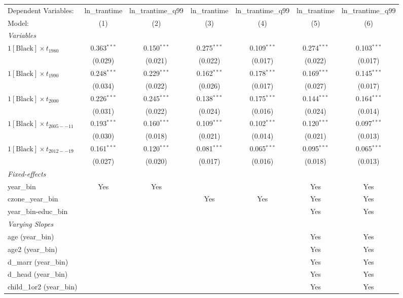 \begin{tabular}{lcccccc}
\tabularnewline\midrule\midrule
Dependent Variables:&ln\_trantime&ln\_trantime\_q99&ln\_trantime&ln\_trantime\_q99&ln\_trantime&ln\_trantime\_q99\\
Model:&(1) & (2) & (3) & (4) & (5) & (6)\\
\midrule \emph{Variables}&   &   &   &   &   &  \\
$1[\text{Black}] \times t_{1980}$ & 0.363$^{***}$ & 0.150$^{***}$ & 0.275$^{***}$ & 0.109$^{***}$ & 0.274$^{***}$ & 0.103$^{***}$\\
  &(0.029) & (0.021) & (0.022) & (0.017) & (0.022) & (0.017)\\
$1[\text{Black}] \times t_{1990}$ & 0.248$^{***}$ & 0.229$^{***}$ & 0.162$^{***}$ & 0.178$^{***}$ & 0.169$^{***}$ & 0.145$^{***}$\\
  &(0.034) & (0.022) & (0.026) & (0.017) & (0.027) & (0.017)\\
$1[\text{Black}] \times t_{2000}$ & 0.226$^{***}$ & 0.245$^{***}$ & 0.138$^{***}$ & 0.175$^{***}$ & 0.144$^{***}$ & 0.164$^{***}$\\
  &(0.031) & (0.022) & (0.024) & (0.016) & (0.024) & (0.014)\\
$1[\text{Black}] \times t_{2005--11}$ & 0.193$^{***}$ & 0.160$^{***}$ & 0.109$^{***}$ & 0.102$^{***}$ & 0.120$^{***}$ & 0.097$^{***}$\\
  &(0.030) & (0.018) & (0.021) & (0.014) & (0.021) & (0.013)\\
$1[\text{Black}] \times t_{2012--19}$ & 0.161$^{***}$ & 0.120$^{***}$ & 0.081$^{***}$ & 0.065$^{***}$ & 0.095$^{***}$ & 0.065$^{***}$\\
  &(0.027) & (0.020) & (0.017) & (0.016) & (0.018) & (0.013)\\
\midrule \emph{Fixed-effects}&   &   &   &   &   &  \\
year\_bin & Yes & Yes &  &  & Yes & Yes\\
czone\_year\_bin &  &  & Yes & Yes & Yes & Yes\\
year\_bin-educ\_bin &  &  &  &  & Yes & Yes\\
\midrule \emph{Varying Slopes}&   &   &   &   &   &  \\
age (year\_bin) &  &  &  &  & Yes & Yes\\
age2 (year\_bin) &  &  &  &  & Yes & Yes\\
d\_marr (year\_bin) &  &  &  &  & Yes & Yes\\
d\_head (year\_bin) &  &  &  &  & Yes & Yes\\
child\_1or2 (year\_bin) &  &  &  &  & Yes & Yes\\

\end{tabular}
